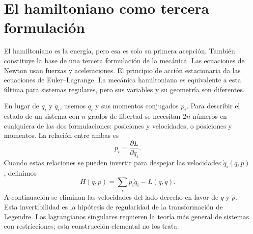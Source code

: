 \begin{classroomqa}
\end{classroomqa}

\begin{classroomqa}
\end{classroomqa}

\section{El hamiltoniano como tercera formulación}

El hamiltoniano es la energía, pero esa es solo su primera acepción. También constituye la base de una tercera formulación de la mecánica. Las ecuaciones de Newton usan fuerzas y aceleraciones. El principio de acción estacionaria da las ecuaciones de Euler--Lagrange. La mecánica hamiltoniana es equivalente a esta última para sistemas regulares, pero sus variables y su geometría son diferentes.

En lugar de \(q_i\) y \(\dot q_i\), usemos \(q_i\) y sus momentos conjugados \(p_i\). Para describir el estado de un sistema con \(n\) grados de libertad se necesitan \(2n\) números en cualquiera de las dos formulaciones: posiciones y velocidades, o posiciones y momentos. La relación entre ambas es
\begin{equation}
  p_i=\frac{\partial L}{\partial\dot q_i}.
  \label{eq:l6-legendre-map}
\end{equation}
Cuando estas relaciones se pueden invertir para despejar las velocidades \(\dot q_i(q,p)\), definimos
\begin{equation}
  H(q,p)=\sum_i p_i\dot q_i-L(q,\dot q).
  \label{eq:l6-hamiltonian-definition}
\end{equation}
A continuación se eliminan las velocidades del lado derecho en favor de \(q\) y \(p\). Esta invertibilidad es la hipótesis de regularidad de la transformación de Legendre. Los lagrangianos singulares requieren la teoría más general de sistemas con restricciones; esta construcción elemental no los trata.

